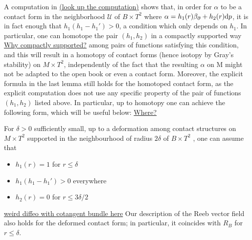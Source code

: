 A computation in \cite{Bourgeois02} \underline{(look up the computation)}
shows that, in order for $\alpha$ to be a contact form in the neighborhood $\mathcal{U}$ of $B \times T^2$ where 
$\alpha = h_1(r) \beta_\partial + h_2(r) \mathrm{d} p$, it is in fact enough that $h_1(h_1 - h_1') > 0$, a condition which only depends on $h_1$.
In particular, one can homotope the pair $(h_1 , h_2)$ in a compactly supported way \underline{Why compactly supported?} among pairs of functions satisfying this condition, 
and this will result in a homotopy of contact forms (hence isotopy by Gray's stability) on $M \times T^2$, 
independently of the fact that the resulting $\alpha$ on M might not be adapted to the open book or even a contact form. 
Moreover, the explicit formula in the last lemma still holds for the homotoped contact form, as the explicit computation does not use any specific property of the pair of functions $(h_1, h_2)$ listed above.
In particular, up to homotopy one can achieve the following form, which
will be useful below: \underline{Where?}
\begin{lemma}
    For $\delta > 0$ sufficiently small, up to a deformation among contact structures on $M\times T^2$ supported in the neighbourhood of radius $2\delta$ of $B \times T^2$ , one can assume that
    \begin{itemize}
        \item $h_1(r) = 1$ for $r \le \delta$
        \item $h_1(h_1 - h_1') > 0$ everywhere
        \item $h_2(r) = 0$ for $r \le 3\delta/2$ 
    \end{itemize}
    \underline{weird diffeo with cotangent bundle here}
    Our description of the Reeb vector field also holds for the deformed contact form; in particular, it coincides with $R_B$ for $r\le \delta$.
\end{lemma}